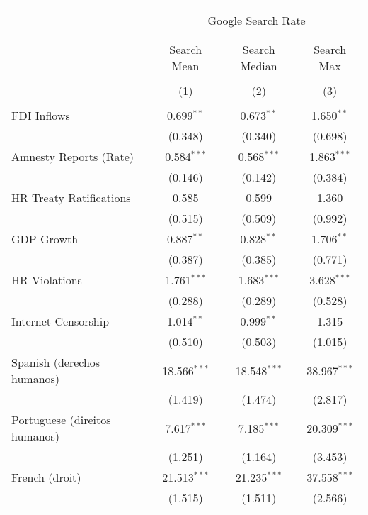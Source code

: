 
\begin{table}[!htbp] \centering 
  \caption{} 
  \label{} 
\begin{tabular}{@{\extracolsep{5pt}}lccc} 
\\[-1.8ex]\hline 
\hline \\[-1.8ex] 
 & \multicolumn{3}{c}{Google Search Rate} \\ 
\cline{2-4} 
\\[-1.8ex] & \multicolumn{3}{c}{ } \\ 
 & Search Mean & Search Median & Search Max \\ 
\\[-1.8ex] & (1) & (2) & (3)\\ 
\hline \\[-1.8ex] 
 FDI Inflows & 0.699$^{**}$ & 0.673$^{**}$ & 1.650$^{**}$ \\ 
  & (0.348) & (0.340) & (0.698) \\ 
  Amnesty Reports (Rate) & 0.584$^{***}$ & 0.568$^{***}$ & 1.863$^{***}$ \\ 
  & (0.146) & (0.142) & (0.384) \\ 
  HR Treaty Ratifications & 0.585 & 0.599 & 1.360 \\ 
  & (0.515) & (0.509) & (0.992) \\ 
  GDP Growth & 0.887$^{**}$ & 0.828$^{**}$ & 1.706$^{**}$ \\ 
  & (0.387) & (0.385) & (0.771) \\ 
  HR Violations & 1.761$^{***}$ & 1.683$^{***}$ & 3.628$^{***}$ \\ 
  & (0.288) & (0.289) & (0.528) \\ 
  Internet Censorship & 1.014$^{**}$ & 0.999$^{**}$ & 1.315 \\ 
  & (0.510) & (0.503) & (1.015) \\ 
  Spanish (derechos humanos) & 18.566$^{***}$ & 18.548$^{***}$ & 38.967$^{***}$ \\ 
  & (1.419) & (1.474) & (2.817) \\ 
  Portuguese (direitos humanos) & 7.617$^{***}$ & 7.185$^{***}$ & 20.309$^{***}$ \\ 
  & (1.251) & (1.164) & (3.453) \\ 
  French (droit) & 21.513$^{***}$ & 21.235$^{***}$ & 37.558$^{***}$ \\ 
  & (1.515) & (1.511) & (2.566) \\ 

\end{tabular}
\end{table}
